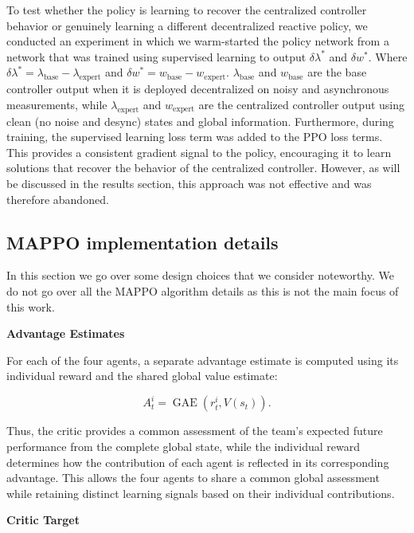 To test whether the policy is learning to recover the centralized
controller behavior or genuinely learning a different decentralized
reactive policy, we conducted an experiment in which we warm-started the
policy network from a network that was trained using supervised
learning to output $\delta\lambda^*$ and $\delta w^*$. Where
$\delta\lambda^* = \lambda_{\text{base}} - \lambda_{\text{expert}}$ and
$\delta w^* = w_{\text{base}} - w_{\text{expert}}$.
$\lambda_{\text{base}}$ and $w_{\text{base}}$ are the base controller output
when it is deployed decentralized on noisy and asynchronous
measurements, while $\lambda_{\text{expert}}$ and $w_{\text{expert}}$
are the centralized controller output using
clean (no noise and desync) states and global information. Furthermore,
during training, the supervised learning loss term was added to the PPO
loss terms. This provides a consistent gradient signal to the policy,
encouraging it to learn solutions that recover the behavior of the
centralized controller. However, as will be discussed in the results
section, this approach was not effective and was therefore abandoned.

\subsection{MAPPO implementation details}

In this section we go over some design choices that we consider
noteworthy. We do not go over all the MAPPO algorithm details as this is
not the main focus of this work.

\noindent\textbf{Advantage Estimates}

For each of the four agents, a separate advantage estimate is computed
using its individual reward and the shared global value estimate:

\begin{equation}
  A_t^i = \operatorname{GAE}(r_t^i, V(s_t)).
  \label{eq:advantage-estimate}
\end{equation}

Thus, the critic provides a common assessment of the team's expected
future performance from the complete global state, while the individual
reward determines how the contribution of each agent is reflected in
its corresponding advantage. This allows the four agents to share a
common global assessment while retaining distinct learning signals
based on their individual contributions.

\noindent\textbf{Critic Target}

